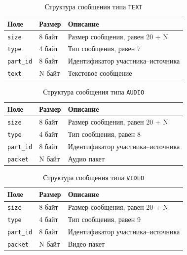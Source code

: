 \begin{table}[H]
  \centering
  \caption{Структура сообщения типа \texttt{TEXT}}
  \label{tbl:msg:text}
  \begin{tabular}{|l|l|l|}
    \hline
    \textbf{Поле} & \textbf{Размер} & \textbf{Описание} \\ \hline
    \texttt{size} & 8 байт & Размер сообщения, равен 20 + N \\ \hline
    \texttt{type} & 4 байт & Тип сообщения, равен 7 \\ \hline
    \texttt{part\_id} & 8 байт & Идентификатор участника--источника \\ \hline
    \texttt{text} & N байт & Текстовое сообщение \\ \hline
  \end{tabular}
\end{table}

\begin{table}[H]
  \centering
  \caption{Структура сообщения типа \texttt{AUDIO}}
  \label{tbl:msg:audio}
  \begin{tabular}{|l|l|l|}
    \hline
    \textbf{Поле} & \textbf{Размер} & \textbf{Описание} \\ \hline
    \texttt{size} & 8 байт & Размер сообщения, равен 20 + N \\ \hline
    \texttt{type} & 4 байт & Тип сообщения, равен 8 \\ \hline
    \texttt{part\_id} & 8 байт & Идентификатор участника--источника \\ \hline
    \texttt{packet} & N байт & Аудио пакет \\ \hline
  \end{tabular}
\end{table}

\begin{table}[H]
  \centering
  \caption{Структура сообщения типа \texttt{VIDEO}}
  \label{tbl:msg:video}
  \begin{tabular}{|l|l|l|}
    \hline
    \textbf{Поле} & \textbf{Размер} & \textbf{Описание} \\ \hline
    \texttt{size} & 8 байт & Размер сообщения, равен 20 + N \\ \hline
    \texttt{type} & 4 байт & Тип сообщения, равен 9 \\ \hline
    \texttt{part\_id} & 8 байт & Идентификатор участника--источника \\ \hline
    \texttt{packet} & N байт & Видео пакет \\ \hline
  \end{tabular}
\end{table}

